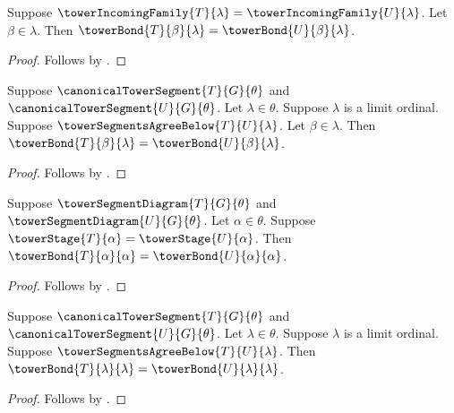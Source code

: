 \begin{proposition}\label{tower_incoming_agreement_at_index}
    Suppose $\towerIncomingFamily{T}{\lambda}=
        \towerIncomingFamily{U}{\lambda}$.
    Let $\beta\in\lambda$.
    Then $\towerBond{T}{\beta}{\lambda}=
        \towerBond{U}{\beta}{\lambda}$.
\end{proposition}
\begin{proof}
    Follows by .
\end{proof}

\begin{proposition}\label{canonical_tower_limit_old_bond_agreement}
    Suppose $\canonicalTowerSegment{T}{G}{\theta}$ and
        $\canonicalTowerSegment{U}{G}{\theta}$.
    Let $\lambda\in\theta$.
    Suppose $\lambda$ is a limit ordinal.
    Suppose $\towerSegmentsAgreeBelow{T}{U}{\lambda}$.
    Let $\beta\in\lambda$.
    Then $\towerBond{T}{\beta}{\lambda}=
        \towerBond{U}{\beta}{\lambda}$.
\end{proposition}
\begin{proof}
    Follows by
        .
\end{proof}

\begin{proposition}\label{tower_self_bond_agreement}
    Suppose $\towerSegmentDiagram{T}{G}{\theta}$ and
        $\towerSegmentDiagram{U}{G}{\theta}$.
    Let $\alpha\in\theta$.
    Suppose $\towerStage{T}{\alpha}=\towerStage{U}{\alpha}$.
    Then $\towerBond{T}{\alpha}{\alpha}=
        \towerBond{U}{\alpha}{\alpha}$.
\end{proposition}
\begin{proof}
    Follows by .
\end{proof}

\begin{proposition}\label{canonical_tower_limit_self_bond_agreement}
    Suppose $\canonicalTowerSegment{T}{G}{\theta}$ and
        $\canonicalTowerSegment{U}{G}{\theta}$.
    Let $\lambda\in\theta$.
    Suppose $\lambda$ is a limit ordinal.
    Suppose $\towerSegmentsAgreeBelow{T}{U}{\lambda}$.
    Then $\towerBond{T}{\lambda}{\lambda}=
        \towerBond{U}{\lambda}{\lambda}$.
\end{proposition}
\begin{proof}
    Follows by
        .
\end{proof}

